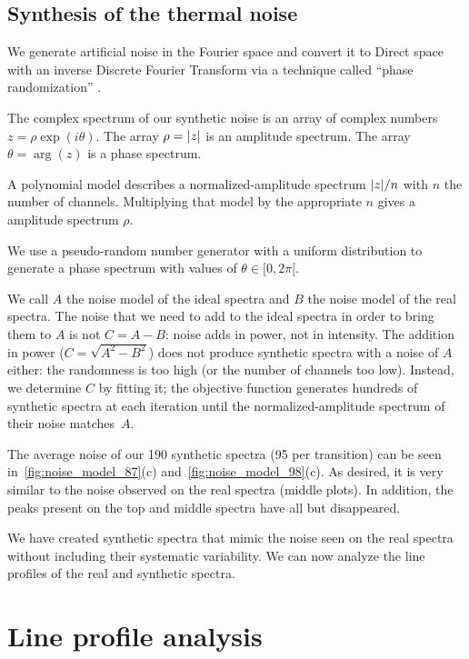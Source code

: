 \FloatBarrier
\subsection{Synthesis of the thermal noise}
We generate artificial noise in the Fourier space and convert it to Direct space with an inverse Discrete Fourier Transform via a technique called ``phase randomization'' \parencite{yamada1991orthonormal}.

The complex spectrum of our synthetic noise is an array of complex numbers $z=\rho \exp(i \theta)$.
The array $\rho=\abs{z}$ is an amplitude spectrum.
The array $\theta=\arg(z)$ is a phase spectrum.

A polynomial model describes a normalized-amplitude spectrum $\abs{z}/n$ with $n$ the number of channels.
Multiplying that model by the appropriate $n$ gives a amplitude spectrum $\rho$.

We use a pseudo-random number generator with a uniform distribution to generate a phase spectrum with values of $\theta \in [0, 2\pi[$.

We call $A$ the noise model of the ideal spectra and $B$ the noise model of the real spectra.
The noise that we need to add to the ideal spectra in order to bring them to $A$ is not
$C=A-B$: noise adds in power, not in intensity.
The addition in power ($C=\sqrt{A^2-B^2}$) does not produce synthetic spectra with a noise of $A$ either: the randomness is too high (or the number of channels too low).
Instead, we determine $C$ by fitting it; the objective function generates hundreds of synthetic spectra at each iteration until the normalized-amplitude spectrum of their noise matches~$A$.

The average noise of our 190 synthetic spectra (95 per transition) can be seen
in~\cref{fig:noise_model_87}(c) and~\cref{fig:noise_model_98}(c).
As desired, it is very similar to the noise observed on the real spectra (middle plots).
In addition, the peaks present on the top and middle spectra have all but disappeared.

We have created synthetic spectra that mimic the noise seen on the real spectra without including their systematic variability.
We can now analyze the line profiles of the real and synthetic spectra.




\FloatBarrier
\section{Line profile analysis}



